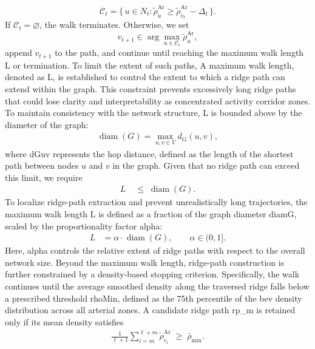 \begin{equation}
\mathcal{C}_t = 
\{\,u \in N_t : 
   \tilde{\rho}^{\mathrm{Ar}}_{u} \ge \tilde{\rho}^{\mathrm{Ar}}_{v_t} - \Delta_t \,\}.
\end{equation}
If $\mathcal{C}_t = \varnothing$, the walk terminates. Otherwise, we set
\begin{equation}
v_{t+1} \in \arg\max_{u \in \mathcal{C}_t}\tilde{\rho}^{\mathrm{Ar}}_{u},
\end{equation}
append $v_{t+1}$ to the path, and continue until reaching the maximum 
walk length \gls{L} or termination. To limit the extent of such paths, A maximum walk length, denoted as \gls{L}, is established to control the extent to which a ridge path can extend within the graph.
This constraint prevents excessively long ridge paths that could lose clarity and interpretability as concentrated activity corridor zones.
To maintain consistency with the network structure, \gls{L} is bounded above by the diameter of the graph:
\begin{align}
\operatorname{diam}(G) = \max_{u,v \in V} d_G(u,v),
\end{align}
where \gls{dGuv} represents the hop distance, defined as the length of the shortest path between nodes $u$ and $v$ in the graph.
Given that no ridge path can exceed this limit, we require
\begin{align}
    L &\;\leq\; \operatorname{diam}(G).
\end{align}
To localize ridge-path extraction and prevent unrealistically long trajectories, the maximum walk length \gls{L} is defined as a fraction of the graph diameter \gls{diamG}, scaled by the proportionality factor \gls{alpha}:
\begin{align}
    L &= \alpha \cdot \operatorname{diam}(G),
    \qquad \alpha \in (0,1].
\end{align}
Here, \gls{alpha} controls the relative extent of ridge paths with respect to the overall network size.
Beyond the maximum walk length, ridge-path construction is further constrained by a density-based stopping criterion. Specifically, the walk continues until the average smoothed density along the traversed ridge falls below a prescribed threshold \gls{rhoMin}, defined as the 75th percentile of the \gls{bev} density distribution across all arterial zones. A candidate ridge path \gls{rp_m} is retained only if its mean density satisfies
\begin{align}
\frac{1}{\ell+1}\sum_{i=m}^{\ell+m} \tilde{\rho}^{\mathrm{Ar}}_{v_i} 
\;\geq\; \bar{\rho}_{\min}.
\end{align}



